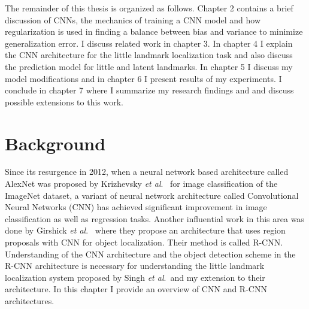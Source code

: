 \documentclass [11pt,letterpaper ,openany ]{report}
\begin{document}
    The remainder of this thesis is organized as follows. Chapter 2 contains a brief discussion of CNNs, the mechanics of training a CNN model and how regularization is used in finding a balance between bias and variance to minimize generalization error. I discuss related work in chapter 3. In chapter 4 I explain the CNN architecture for the little landmark localization task and also discuss the prediction model for little and latent landmarks. In chapter 5 I discuss my model modifications and in chapter 6 I present results of my experiments. I conclude in chapter 7 where I summarize my research findings and and discuss possible extensions to this work.

    \chapter{Background}
    \doublespacing
    Since its resurgence in 2012, when a neural network based architecture called AlexNet was proposed by Krizhevsky \textit{et al}.\ \cite{krizhevsky2012imagenet} for image classification of the ImageNet \cite{russakovsky2015imagenet} dataset, a variant of neural network architecture called Convolutional Neural Networks (CNN) has achieved significant improvement in image classification as well as regression tasks. Another influential work in this area was done by Girshick \textit{et al}.\ \cite{girshick2014rich} where they propose an architecture that uses region proposals with CNN for object localization. Their method is called R-CNN. Understanding of the CNN architecture and the object detection scheme in the R-CNN architecture is necessary for understanding the little landmark localization system proposed by Singh \textit{et al}.\ and my extension to their architecture. In this chapter I provide an overview of CNN and R-CNN architectures. 
\end{document}
